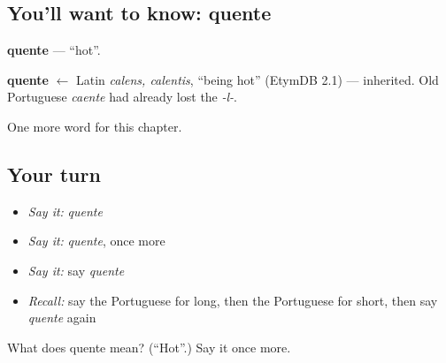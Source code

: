\subsection*{You'll want to know: quente}
\textbf{quente} — \textquotedblleft{}hot\textquotedblright{}.

\begin{cousinweb}
\textbf{quente} $\leftarrow$ Latin \emph{calens, calentis}, \textquotedblleft{}being hot\textquotedblright{} (EtymDB 2.1) — inherited. Old Portuguese \emph{caente} had already lost the \emph{-l-}.
\end{cousinweb}

\begin{grammarlens}[title={What you've built}]
One more word for this chapter.
\end{grammarlens}

\subsection*{Your turn}
\begin{itemize}
\raggedright
  \item \emph{Say it:} \emph{quente}
  \item \emph{Say it:} \emph{quente}, once more
  \item \emph{Say it:} say \emph{quente}
  \item \emph{Recall:} say the Portuguese for long, then the Portuguese for short, then say \emph{quente} again
\end{itemize}

\begin{tcolorbox}[breakable,colback=teal!4,colframe=teal!35!black,title={Before you move on}]
What does quente mean? (\textquotedblleft{}Hot\textquotedblright{}.) Say it once more.
\end{tcolorbox}
